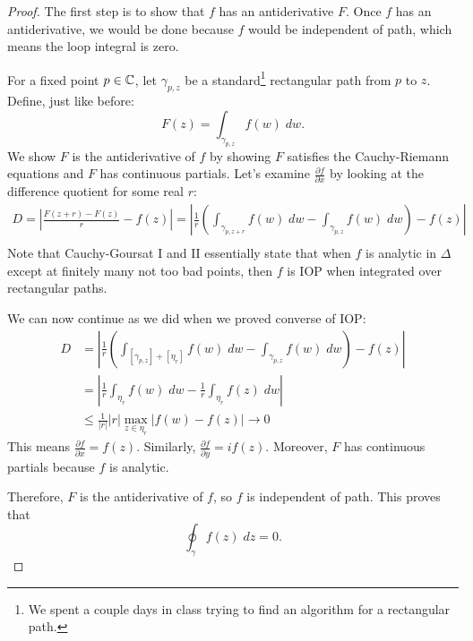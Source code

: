 \documentclass[notes]{subfile}
\begin{document}
\begin{proof}
    The first step is to show that $f$ has an antiderivative $F$.
    Once $f$ has an antiderivative, we would be done
    because $f$ would be independent of path, which means
    the loop integral is zero.

    \noindent
    For a fixed point $p \in \operatorname{\mathbb{C}}$, let $\gamma_{p, z}$ be a standard\footnote{We spent a couple days in class trying to
        find an algorithm for a rectangular path.
    }
    rectangular path from $p$ to $z$. 
    Define, just like before:
    \[ F(z) = \int_{\gamma_{p, z}} f(w) \; dw .\]
    We show $F$ is the antiderivative of $f$ by showing
    $F$ satisfies the Cauchy-Riemann equations and $F$ 
    has continuous partials.
    Let's examine $\frac{\partial f}{\partial x}$ by 
    looking at the difference quotient for some real $r$:
    \begin{align*}
        D = 
        \left| \frac{F(z+r) - F(z)}{r} - f(z)\right| =
        \left| \frac{1}{r}\left( \int_{\gamma_{p, z+r}} f(w) \; dw - 
        \int_{\gamma_{p, z}} f(w) \; dw \right)  - f(z) \right| \\
    \end{align*}
    Note that Cauchy-Goursat I and II essentially state that
    when $f$ is analytic in $\Delta$ except at finitely many
    not too bad points, then $f$ is IOP when integrated
    over rectangular paths.

    \noindent
    We can now continue as we did when we proved converse of IOP:
    \begin{align*}
        D &= \left| \frac{1}{r}\left( \int_{[\gamma_{p, z}] + [\eta_r]} f(w) \; dw - 
        \int_{\gamma_{p, z}} f(w) \; dw \right)  - f(z) \right| \tag{Independence of Path} \\
        &= \left| \frac{1}{r} \int_{\eta_r} f(w) \; dw - 
        \frac{1}{r} \int_{\eta_r} f(z) \; dw  \right| \tag{Concatenation of Paths} \\
        &\le \frac{1}{|r|} |r| \max_{z \in \eta_r} |f(w) - f(z)|
        \to 0 \tag{ML and Continuity of $f$}
    \end{align*}
    This means $\frac{\partial f}{\partial x} = f(z)$.
    Similarly, $\frac{\partial f}{\partial y} = if(z)$.
    Moreover, $F$ has continuous partials because $f$ is analytic.
    
    \noindent
    Therefore, $F$ is the antiderivative of $f$, so
    $f$ is independent of path.
    This proves that
    \[ \oint_{\gamma} f(z) \; dz = 0. \]
\end{proof}
\end{document}
